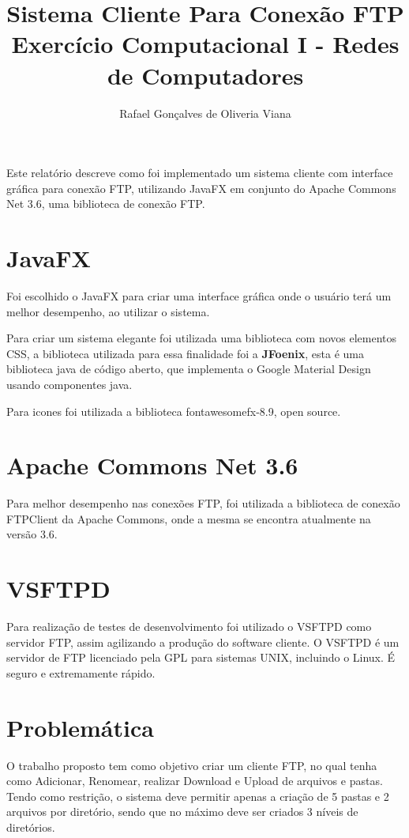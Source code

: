 \documentclass[12pt]{article}
\title{Sistema Cliente Para Conexão FTP  \\ Exercício Computacional I - Redes de Computadores}
\author{Rafael Gonçalves de Oliveria Viana\inst{1} }
\begin{document}
 

\maketitle

     
\begin{resumo} 	
  Este relatório descreve como foi implementado um sistema cliente com interface gráfica para conexão FTP, utilizando JavaFX em conjunto do Apache Commons Net 3.6, uma biblioteca de conexão FTP.
\end{resumo}


\section{JavaFX}

Foi escolhido o JavaFX para criar uma interface gráfica onde o usuário terá um melhor desempenho, ao utilizar o sistema.\cite{topley2010javafx}

Para criar um sistema elegante foi utilizada uma biblioteca com novos elementos CSS, a biblioteca utilizada para essa finalidade foi  a \textbf{JFoenix}, esta é uma biblioteca java de código aberto, que implementa o Google Material Design usando componentes java.\cite{JFoenix}

Para icones foi utilizada a biblioteca fontawesomefx-8.9, open source.\cite{FontAwesomeFX}
	
\section{Apache Commons Net 3.6} 

Para melhor desempenho nas conexões FTP, foi utilizada a biblioteca de conexão FTPClient da Apache Commons, onde a mesma se encontra atualmente na versão 3.6.\cite{Apache}

\section{VSFTPD}
Para realização de testes de desenvolvimento foi utilizado o VSFTPD como servidor FTP, assim agilizando a produção do software cliente.
O VSFTPD é um servidor de FTP licenciado pela GPL para sistemas UNIX, incluindo o Linux. É seguro e extremamente rápido.\cite{bauer2004paranoid}

\section{Problemática}
O trabalho proposto tem como objetivo criar um cliente FTP, no qual tenha como Adicionar, Renomear, realizar Download e Upload de arquivos e pastas. Tendo como restrição, o sistema deve permitir apenas a criação de 5 pastas e 2 arquivos por diretório, sendo que no máximo deve ser criados 3 níveis de diretórios.
 
\end{document}
